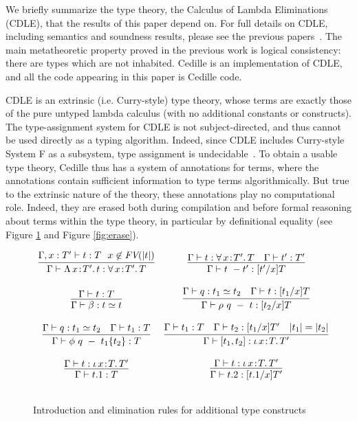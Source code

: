 \documentclass[acmsmall]{acmart}\settopmatter{}
\newcommand{\reffig}[1]{Figure \ref{fig:#1}}
\newcommand{\labfig}[1]{\label{fig:#1}}
\newcommand{\abs}[4]{{#1}\, #2\! : \! #3.\, #4}
\begin{document}
We briefly summarize the type theory,
the Calculus of Lambda Eliminations (CDLE),
that the results  of this paper depend on.
For full details on CDLE, including semantics and
soundness results, please see the previous
papers~\cite{stump17a,stump18}.
The main metatheoretic property
proved in the previous work is logical consistency: there are types
which are not inhabited.
Cedille is an implementation of CDLE, and all the
code appearing in this paper is Cedille code.

CDLE is an extrinsic (i.e. Curry-style)
type theory, whose terms are exactly those of the pure untyped lambda
calculus (with no additional constants or constructs).  The
type-assignment system for CDLE is not subject-directed, and thus
cannot be used directly as a typing algorithm.  Indeed, since CDLE
includes Curry-style System F as a subsystem, type assignment is
undecidable~\cite{Wells99}.  To obtain a usable type theory, Cedille
thus has a system of annotations for terms, where the annotations
contain sufficient information to type terms algorithmically.  But
true to the extrinsic nature of the theory, these annotations play no
computational role.  Indeed, they are erased both during compilation
and before formal reasoning about terms within the type theory, in
particular by definitional equality (see \reffig{cdle} and \reffig{erase}).

\begin{figure}
\centering
  \[
  \begin{array}{cc}
    \infer{\Gamma\vdash \abs{\Lambda}{x}{T'}{t} : \abs{\forall}{x}{T'}{T}}{\Gamma,x:T'\vdash t : T & \!\!x\not\in\textit{FV}(|t|)} & 
    \infer{\Gamma\vdash t\ -t' : [t'/x]T}{\Gamma\vdash t : \abs{\forall}{x}{T'}{T} & \Gamma\vdash t':T'} \\ \\

    \infer{\Gamma\vdash \beta : t \simeq t}{\Gamma\vdash t : T} &
    \infer{\Gamma\vdash \rho\ q\ -\ t : [t_2/x]T}{\Gamma\vdash q : t_1 \simeq t_2 & \Gamma \vdash t : [t_1/x]T} \\ \\

    \infer{\Gamma\vdash \phi\ q\ -\ t_1 \{t_2\} : T}{\Gamma\vdash q : t_1 \simeq t_2 & \Gamma \vdash t_1 : T} &
    \infer{\Gamma\vdash [t_1,t_2] : \abs{\iota}{x}{T}{T'}}{\Gamma\vdash t_1 : T & \Gamma\vdash t_2 : [t_1/x]T' & |t_1| = |t_2|} \\ \\

    \infer{\Gamma\vdash t.1 : T}{\Gamma\vdash t : \abs{\iota}{x}{T}{T'}} &
    \infer{\Gamma\vdash t.2 : [t.1/x]T'}{\Gamma\vdash t : \abs{\iota}{x}{T}{T'}} \\ \\

  \end{array}
  \]
\caption{Introduction and elimination rules for additional type constructs} 
\labfig{cdle}
\end{figure}
\end{document}
